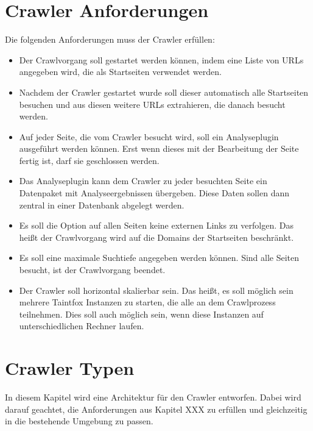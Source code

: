 \section{Crawler Anforderungen}
Die folgenden Anforderungen muss der Crawler erfüllen:
\begin{itemize}
	\item Der Crawlvorgang soll gestartet werden können, indem eine Liste von URLs angegeben wird, die als Startseiten verwendet werden.
	\item Nachdem der Crawler gestartet wurde soll dieser automatisch alle Startseiten besuchen und aus diesen weitere URLs extrahieren, die danach besucht werden.
	\item Auf jeder Seite, die vom Crawler besucht wird, soll ein Analyseplugin ausgeführt werden können. Erst wenn dieses mit der Bearbeitung der Seite fertig ist, darf sie geschlossen werden.
	\item Das Analyseplugin kann dem Crawler zu jeder besuchten Seite ein Datenpaket mit Analyseergebnissen übergeben. Diese Daten sollen dann zentral in einer Datenbank abgelegt werden.
	\item Es soll die Option auf allen Seiten keine externen Links zu verfolgen. Das heißt der Crawlvorgang wird auf die Domains der Startseiten beschränkt.
	\item Es soll eine maximale Suchtiefe angegeben werden können. Sind alle Seiten besucht, ist der Crawlvorgang beendet.
	\item Der Crawler soll horizontal skalierbar sein. Das heißt, es soll möglich sein mehrere Taintfox Instanzen zu starten, die alle an dem Crawlprozess teilnehmen. Dies soll auch möglich sein, wenn diese Instanzen auf unterschiedlichen Rechner laufen.
\end{itemize}

\section{Crawler Typen}
In diesem Kapitel wird eine Architektur für den Crawler entworfen. Dabei wird darauf geachtet, die Anforderungen aus Kapitel XXX zu erfüllen und gleichzeitig in die bestehende Umgebung zu passen.

